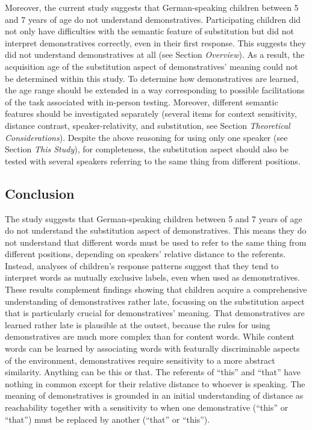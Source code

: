 \documentclass[
  man,floatsintext]{apa6}
\begin{document}
Moreover, the current study suggests that German-speaking children between 5 and 7 years of age do not understand demonstratives. Participating children did not only have difficulties with the semantic feature of substitution but did not interpret demonstratives correctly, even in their first response. This suggests they did not understand demonstratives at all (see Section \emph{Overview}). As a result, the acquisition age of the substitution aspect of demonstratives' meaning could not be determined within this study. To determine how demonstratives are learned, the age range should be extended in a way corresponding to possible facilitations of the task associated with in-person testing. Moreover, different semantic features should be investigated separately (several items for context sensitivity, distance contrast, speaker-relativity, and substitution, see Section \emph{Theoretical Considerations}). Despite the above reasoning for using only one speaker (see Section \emph{This Study}), for completeness, the substitution aspect should also be tested with several speakers referring to the same thing from different positions.

\subsection{Conclusion}\label{conclusion}

The study suggests that German-speaking children between 5 and 7 years of age do not understand the substitution aspect of demonstratives. This means they do not understand that different words must be used to refer to the same thing from different positions, depending on speakers' relative distance to the referents. Instead, analyses of children's response patterns suggest that they tend to interpret words as mutually exclusive labels, even when used as demonstratives. These results complement findings showing that children acquire a comprehensive understanding of demonstratives rather late, focussing on the substitution aspect that is particularly crucial for demonstratives' meaning. That demonstratives are learned rather late is plausible at the outset, because the rules for using demonstratives are much more complex than for content words. While content words can be learned by associating words with featurally discriminable aspects of the environment, demonstratives require sensitivity to a more abstract similarity. Anything can be this or that. The referents of ``this'' and ``that'' have nothing in common except for their relative distance to whoever is speaking. The meaning of demonstratives is grounded in an initial understanding of distance as reachability together with a sensitivity to when one demonstrative (``this'' or ``that'') must be replaced by another (``that'' or ``this'').
\end{document}
